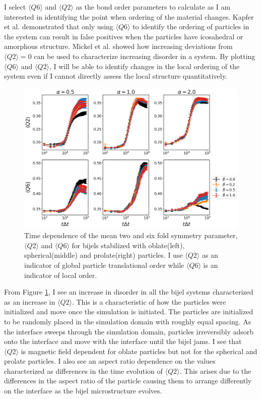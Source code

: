 I select $\langle Q6 \rangle$ and $\langle Q2 \rangle$ as the bond order parameters to calculate as I am interested in identifying the point when ordering 
of the material changes. Kapfer et al. demonstrated that only using $\langle Q6 \rangle$ to identify the ordering of particles in the system can result in 
false positives when the particles have icosahedral or amorphous structure. \cite{kapfer_jammed_2012} Mickel et al. showed how increasing deviations from 
$\langle Q2 \rangle = 0$ can be used to characterize increasing disorder in a system. \cite{mickel_shortcomings_2013} By plotting $\langle Q6 \rangle$ and 
$\langle Q2 \rangle$, I will be able to identify changes in the local ordering of the system even if I cannot directly assess the local structure quantitatively.

\begin{figure} 
    \centering 
    \includegraphics[width=\columnwidth]{figures/results/paper1/steinhardt_vs_coverage.png} 
    \caption{Time dependence of the mean two and six fold symmetry parameter, $\langle Q2 \rangle$ and $\langle Q6 \rangle$ 
    for bijels stabilized with oblate(left), spherical(middle) and prolate(right) particles. I use $\langle Q2 \rangle$ as an
    indicator of global particle translational order while $\langle Q6 \rangle$ is an indicator of local order.} 
    \label{fig:steinhardt_coverage} 
\end{figure}

From Figure \ref{fig:steinhardt_coverage}, I see an increase in disorder in all the bijel systems characterized as an increase in $\langle Q2 \rangle$. 
This is a characteristic of how the particles were initialized and move once the simulation is initiated. The particles are initialized to be randomly placed 
in the simulation domain with roughly equal spacing. As the interface sweeps through the simulation domain, particles irreversibly adsorb onto the interface 
and move with the interface until the bijel jams. I see that $\langle Q2 \rangle$ is magnetic field dependent for oblate particles but not for the spherical 
and prolate particles. I also see an aspect ratio dependence on the values characterized as differences in the time evolution of $\langle Q2 \rangle$. This 
arises due to the differences in the aspect ratio of the particle causing them to arrange differently on the interface as the bijel microstructure evolves.

